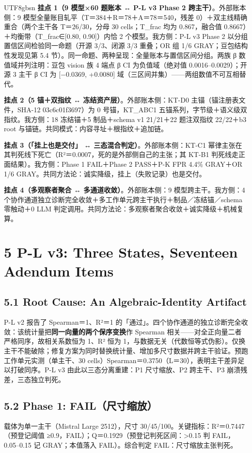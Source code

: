 \documentclass[10pt,a4paper]{article}
\begin{document}
\begin{CJK}{UTF8}{gbsn}
\textbf{挂点 1（9 模型×60 题账本 ↔ P-L v3 Phase 2 跨主干）}。外部账本侧：9 模型全量账目轧平（T＝384＋R＝78＋A＝78＝540，残差 0）＋双主线精确重合（两个主干各 T＝26/30，分母 30 cells；T\_frac 均为 0.867，融合值 0.8667）＋均衡带（T\_frac∈[0.80, 0.90]）内恰 2 个模型。我方侧：P-L v3 Phase 2 以分组置信区间检验同一命题（开源 3/3、闭源 3/3 重叠；OR 组 1/6 GRAY；豆包结构性发现见第 5.4 节）。同一命题、两种呈现：全量账本与置信区间分组。两族 β 数值域并列注明：豆包 vision 族 4 端点 β CI 为负值域（绝对值 0.0016–0.0029）；开源 3 主干 β CI 为 [−0.0369, +0.0080] 域（三区间并集）——两组数值不可互相替代。

\textbf{挂点 2（5 锚＋双指纹 ↔ 冻结资产层）}。外部账本侧：KT-D0 主锚（锚注册表文件，SHA-12 03c6c01f3697）为 0 号锚，KT\_ABC1 五锚系列，字节级＋语义级双指纹。我方侧：18 冻结锚＋5 制品＋schema v1 21/21＋22 题注双指纹 22/22＋b3 root 与锚链。共同模式：内容寻址＋根指纹＋追加链。

\textbf{挂点 3（「挂上也是交付」 ↔ 三态混合判定）}。外部账本侧：KT-C1 幂律主张在其判死线下死亡（R²＝0.0007，死的是外部侧自己的主张；其 KT-B1 判死线走正面结果）。我方侧：Phase 1 FAIL＋Phase 2 PASS＋P-K FPR 4.4\% GRAY＋OR 1/6 GRAY。共同方法论：诚实降级，挂上（失败记录）也是交付。

\textbf{挂点 4（多观察者聚合 ↔ 多通道收敛）}。外部账本侧：9 模型跨主干。我方侧：4 个协作通道独立诊断完全收敛＋多工作单元跨主干执行＋制品／冻结锚／schema 零触动＋0 LLM 判定调用。共同方法论：多观察者聚合收敛＋诚实降级＋机械复算。


\section*{5 P-L v3: Three States, Seventeen Adendum Items}\subsection*{5.1 Root Cause: An Algebraic-Identity Artifact}P-L v2 报告了 Spearman＝1、R²＝1 的「通过」。四个协作通道的独立诊断完全收敛：该统计量把\textbf{同一向量的两个保序变换}作 Spearman 相关——对全正向量二者严格同序，故相关系数恒为 1、R² 恒为 1，与数据无关（代数恒等式伪影）。仅换主干不能破除；修复方案为同时替换统计量、增加多尺寸数据并跨主干验证。预跑工作单元实测（单主干、30 cells）Spearman＝0.3750（L＝30），表明主干差异足以打破同序。P-L v3 由此以三态分离重建：P1 尺寸缩放、P2 跨主干、P3 崩溃残差，三态独立判死。

\subsection*{5.2 Phase 1: FAIL（尺寸缩放）}载体为单一主干（Mistral Large 2512），尺寸 30/45/100。关键指标：R²＝0.7447（预登记阈值 ≥0.9，FAIL）；Q＝0.1929（预登记判死区间：>0.15 判 FAIL，0.05–0.15 记 GRAY；本值落入 FAIL）。综合判定 FAIL：尺寸缩放主张判死。


\end{CJK}
\end{document}
